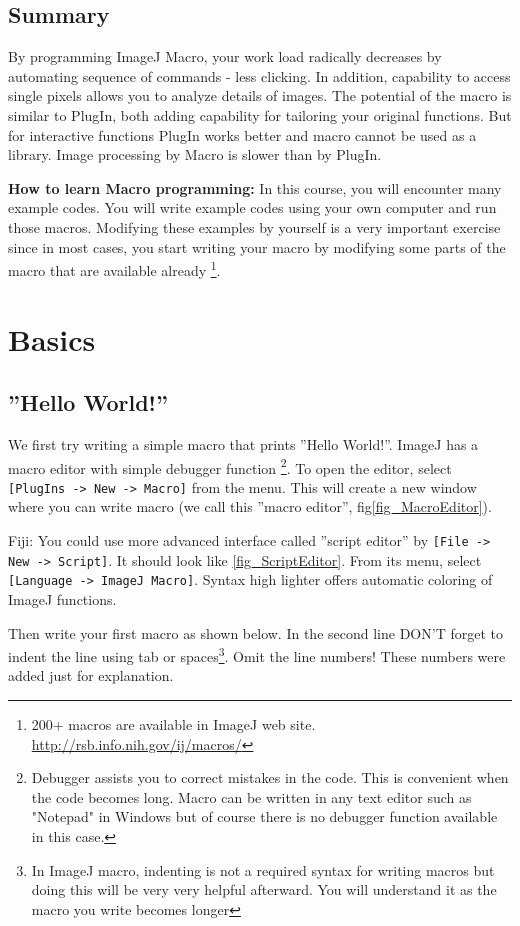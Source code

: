 \documentclass[11pt,a4paper,oneside]{report}
\newenvironment{indentFiji}%
{\begin{list}{}%
         {\setlength{\leftmargin}{1em}}%
         \item[]%
}
{\end{list}}
\newcommand{\ijmenu}[1]{\texttt{\small#1}}
\begin{document}
\subsection{Summary}
By programming ImageJ Macro, your work load radically decreases by automating sequence of commands - less clicking. 
In addition, capability to access single pixels allows you to analyze details of images. 
The potential of the macro is similar to PlugIn, both adding capability for tailoring your original functions. But for interactive functions PlugIn works better and macro cannot be used as a library.  
Image processing by Macro is slower than by PlugIn. 

\textbf{How to learn Macro programming:} 
In this course, you will encounter many example codes. 
You will write example codes using your own computer and run those macros. 
Modifying these examples by yourself is a very important exercise since in most
cases, you start writing your macro by modifying some parts of the macro that are available already \footnote{200+ macros are available in ImageJ web site. 
\href{http://rsb.info.nih.gov/ij/macros/}{http://rsb.info.nih.gov/ij/macros/}}.
 
\newpage
\section{Basics}

\subsection{''Hello World!''}

We first try writing a simple macro that prints ''Hello World!''. 
ImageJ has a macro editor with simple debugger function
\footnote{Debugger assists you to correct mistakes in the code. 
This is convenient when the code becomes long. 
Macro can be written in any text editor such as "Notepad" in Windows but of course 
there is no debugger function available in this case.}. 
To open the editor, select \ijmenu{[PlugIns -> New -> Macro]} from the menu.  
This will create a new window where you can write macro (we call this ''macro
editor'', fig\ref{fig_MacroEditor}).
\begin{indentFiji}
Fiji: You could use more advanced interface called ''script editor'' 
by \ijmenu{[File -> New -> Script]}. It should look like \ref{fig_ScriptEditor}. 
From its menu, select \ijmenu{[Language -> ImageJ Macro]}. 
Syntax high lighter offers automatic coloring of ImageJ functions. 
\end{indentFiji}
Then write your first macro as shown below. In the second line DON'T forget to
indent the line using tab or spaces\footnote{In ImageJ macro, indenting is not a required
syntax for writing macros but doing this will be very very helpful afterward. You
will understand it as the macro you write becomes longer}. Omit the line
numbers! These numbers were added just for explanation.
\end{document}
